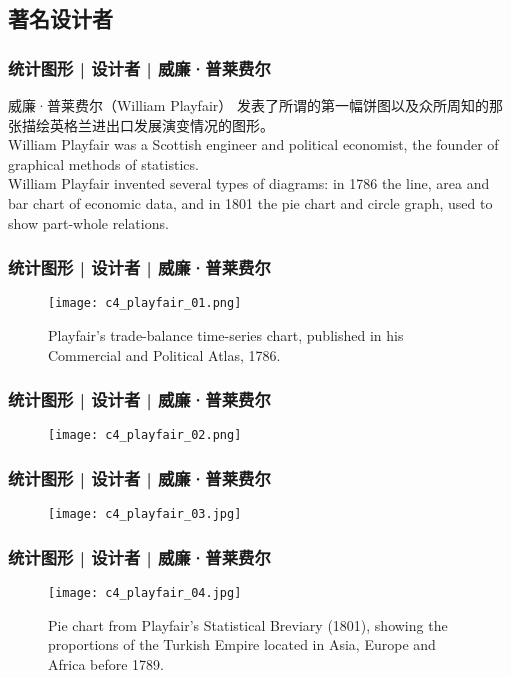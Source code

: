 \subsection{著名设计者}
\begin{frame}
  \frametitle{统计图形 | 设计者 | 威廉·普莱费尔}
  \begin{block}{威廉·普莱费尔（William Playfair）}
    发表了所谓的第一幅饼图以及众所周知的那张描绘英格兰进出口发展演变情况的图形。\\
    \vspace{0.5em}
    William Playfair was a Scottish engineer and political economist, the founder of graphical methods of statistics.\\
    \vspace{0.5em}
    William Playfair invented several types of diagrams: in 1786 the line, area and bar chart of economic data, and in 1801 the pie chart and circle graph, used to show part-whole relations.
  \end{block}
\end{frame}

\begin{frame}
  \frametitle{统计图形 | 设计者 | 威廉·普莱费尔}
  \begin{figure}
    \centering
    \texttt{[image: c4\_playfair\_01.png]}
    \caption{Playfair's trade-balance time-series chart, published in his Commercial and Political Atlas, 1786.}
  \end{figure}
\end{frame}

\begin{frame}
  \frametitle{统计图形 | 设计者 | 威廉·普莱费尔}
  \begin{figure}
    \centering
    \texttt{[image: c4\_playfair\_02.png]}
  \end{figure}
\end{frame}

\begin{frame}
  \frametitle{统计图形 | 设计者 | 威廉·普莱费尔}
  \begin{figure}
    \centering
    \texttt{[image: c4\_playfair\_03.jpg]}
  \end{figure}
\end{frame}

\begin{frame}
  \frametitle{统计图形 | 设计者 | 威廉·普莱费尔}
  \begin{figure}
    \centering
    \texttt{[image: c4\_playfair\_04.jpg]}
    \caption{Pie chart from Playfair's Statistical Breviary (1801), showing the proportions of the Turkish Empire located in Asia, Europe and Africa before 1789.}
  \end{figure}
\end{frame}

